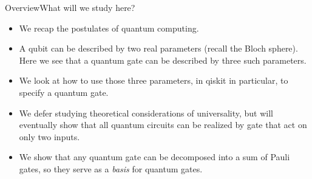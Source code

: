 
\begin{frame}{Overview}{What will we study here?}
\begin{itemize}
    \item We recap the postulates of quantum computing.
    \item A qubit can be described by two real parameters (recall the Bloch sphere).  Here we see that a quantum gate can be described by three such parameters.
    \item We look at how to use those three parameters, in qiskit in particular, to specify a quantum gate.
    \item We defer studying theoretical considerations of universality, but will eventually show that all quantum circuits can be realized by gate that act on only two inputs.
    \item We show that any quantum gate can be decomposed into a sum of Pauli gates, so they serve as a \emph{basis} for quantum gates.
\end{itemize}
\end{frame}

